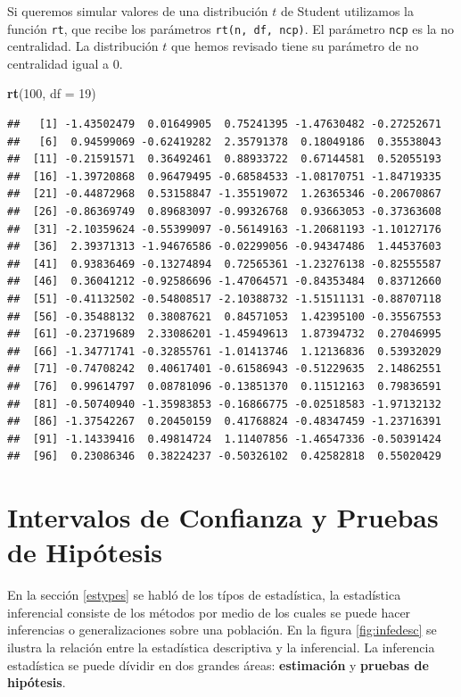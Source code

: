 \documentclass[letterpaper,]{book}
\newenvironment{Shaded}{\begin{snugshade}}{\end{snugshade}}
\newcommand{\DataTypeTok}[1]{\textcolor[rgb]{0.13,0.29,0.53}{#1}}
\newcommand{\DecValTok}[1]{\textcolor[rgb]{0.00,0.00,0.81}{#1}}
\newcommand{\KeywordTok}[1]{\textcolor[rgb]{0.13,0.29,0.53}{\textbf{#1}}}
\newcommand{\NormalTok}[1]{#1}
\begin{document}
Si queremos simular valores de una distribución \(t\) de Student utilizamos la función \texttt{rt}, que recibe los parámetros \texttt{rt(n,\ df,\ ncp)}. El parámetro \texttt{ncp} es la no centralidad. La distribución \(t\) que hemos revisado tiene su parámetro de no centralidad igual a \(0\).

\begin{Shaded}
\begin{Highlighting}[]
\KeywordTok{rt}\NormalTok{(}\DecValTok{100}\NormalTok{, }\DataTypeTok{df =} \DecValTok{19}\NormalTok{)}
\end{Highlighting}
\end{Shaded}

\begin{verbatim}
##   [1] -1.43502479  0.01649905  0.75241395 -1.47630482 -0.27252671
##   [6]  0.94599069 -0.62419282  2.35791378  0.18049186  0.35538043
##  [11] -0.21591571  0.36492461  0.88933722  0.67144581  0.52055193
##  [16] -1.39720868  0.96479495 -0.68584533 -1.08170751 -1.84719335
##  [21] -0.44872968  0.53158847 -1.35519072  1.26365346 -0.20670867
##  [26] -0.86369749  0.89683097 -0.99326768  0.93663053 -0.37363608
##  [31] -2.10359624 -0.55399097 -0.56149163 -1.20681193 -1.10127176
##  [36]  2.39371313 -1.94676586 -0.02299056 -0.94347486  1.44537603
##  [41]  0.93836469 -0.13274894  0.72565361 -1.23276138 -0.82555587
##  [46]  0.36041212 -0.92586696 -1.47064571 -0.84353484  0.83712660
##  [51] -0.41132502 -0.54808517 -2.10388732 -1.51511131 -0.88707118
##  [56] -0.35488132  0.38087621  0.84571053  1.42395100 -0.35567553
##  [61] -0.23719689  2.33086201 -1.45949613  1.87394732  0.27046995
##  [66] -1.34771741 -0.32855761 -1.01413746  1.12136836  0.53932029
##  [71] -0.74708242  0.40617401 -0.61586943 -0.51229635  2.14862551
##  [76]  0.99614797  0.08781096 -0.13851370  0.11512163  0.79836591
##  [81] -0.50740940 -1.35983853 -0.16866775 -0.02518583 -1.97132132
##  [86] -1.37542267  0.20450159  0.41768824 -0.48347459 -1.23716391
##  [91] -1.14339416  0.49814724  1.11407856 -1.46547336 -0.50391424
##  [96]  0.23086346  0.38224237 -0.50326102  0.42582818  0.55020429
\end{verbatim}

\hypertarget{icph}{%
\chapter{Intervalos de Confianza y Pruebas de Hipótesis}\label{icph}}

En la sección \ref{estypes} se habló de los típos de estadística, la estadística inferencial consiste de los métodos por medio de los cuales se puede hacer inferencias o generalizaciones sobre una población. En la figura \ref{fig:infedesc} se ilustra la relación entre la estadística descriptiva y la inferencial. La inferencia estadística se puede dívidir en dos grandes áreas: \textbf{estimación} y \textbf{pruebas de hipótesis}.
\end{document}
